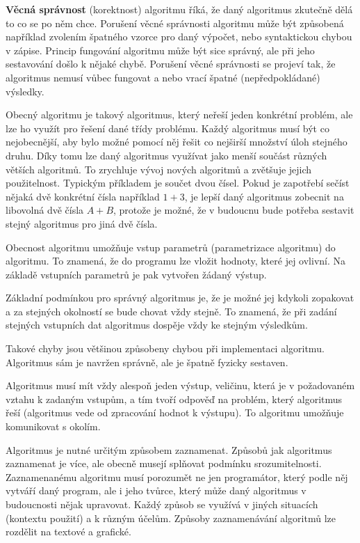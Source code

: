 
{\bf Věcná správnost} (korektnost) algoritmu říká, že daný algoritmus zkutečně dělá to co se po něm chce. Porušení věcné správnosti algoritmu může být způsobená například zvolením špatného vzorce pro daný výpočet, nebo syntaktickou chybou v zápise. Princip fungování algoritmu může být sice správný, ale při jeho sestavování došlo k nějaké chybě. 
Porušení věcné správnosti se projeví tak, že algoritmus nemusí vůbec fungovat a nebo vrací špatné (nepředpokládané) výsledky.


Obecný algoritmu je takový algoritmus, který neřeší jeden konkrétní problém, ale lze ho využít pro řešení dané třídy problému. Každý algoritmus musí být co nejobecnější, aby bylo možné pomocí něj řešit co nejširší množství úloh stejného druhu. Díky tomu lze daný algoritmus využívat jako menší součást různých větších algoritmů. To zrychluje vývoj nových algoritmů a zvětšuje jejich použitelnost. Typickým příkladem je součet dvou čísel. Pokud je zapotřebí sečíst nějaká dvě konkrétní čísla například $1+3$, je lepší daný algoritmus zobecnit na libovolná dvě čísla $A+B$, protože je možné, že v budoucnu bude potřeba sestavit stejný  algoritmus pro jiná dvě čísla.

Obecnost algoritmu umožňuje vstup parametrů (parametrizace algoritmu) do algoritmu. To znamená, že do programu lze vložit hodnoty, které jej ovlivní. Na základě vstupních parametrů je pak vytvořen žádaný výstup. 



Základní podmínkou pro správný algoritmus je, že je možné jej kdykoli zopakovat a za stejných okolností se bude chovat vždy stejně. To znamená, že při zadání stejných vstupních dat algoritmus dospěje vždy ke stejným výsledkům. 

Takové chyby jsou většinou způsobeny chybou při implementaci algoritmu. Algoritmus sám je navržen správně, ale je špatně fyzicky sestaven. 


Algoritmus musí mít vždy alespoň jeden výstup, veličinu, která je v požadovaném vztahu k zadaným vstupům, a tím tvoří odpověď na problém, který algoritmus řeší (algoritmus vede od zpracování hodnot k výstupu). To algoritmu umožňuje komunikovat s okolím.


Algoritmus je nutné určitým způsobem zaznamenat. Způsobů jak algoritmus zaznamenat je více, ale obecně musejí splňovat podmínku srozumitelnosti. Zaznamenanému algoritmu musí porozumět ne jen programátor, který podle něj vytváří daný program, ale i jeho tvůrce, který může daný algoritmus v budoucnosti nějak upravovat. Každý způsob se využívá v jiných situacích (kontextu použití) a k různým účelům. Způsoby zaznamenávání algoritmů lze rozdělit na textové a grafické.

